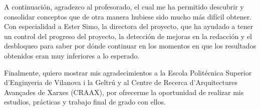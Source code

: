 A continuación, agradezco al profesorado, el cual me ha permitido descubrir y consolidar conceptos que de otra manera hubiese sido mucho más difícil obtener. Con especialidad a Ester Simo, la directora del proyecto, que ha ayudado a tener un control del progreso del proyecto, la detección de mejoras en la redacción y el desbloqueo para saber por dónde continuar en los momentos en que los resultados obtenidos eran muy inferiores a lo esperado.

Finalmente, quiero mostrar mis agradecimientos a la Escola Politécnica Superior d'Enginyeria de Vilanova i la Geltrú y al Centre de Recerca d'Arquitectures Avançades de Xarxes (CRAAX), por ofrecerme la oportunidad de realizar mis estudios, prácticas y trabajo final de grado con ellos. 

\color{black}
